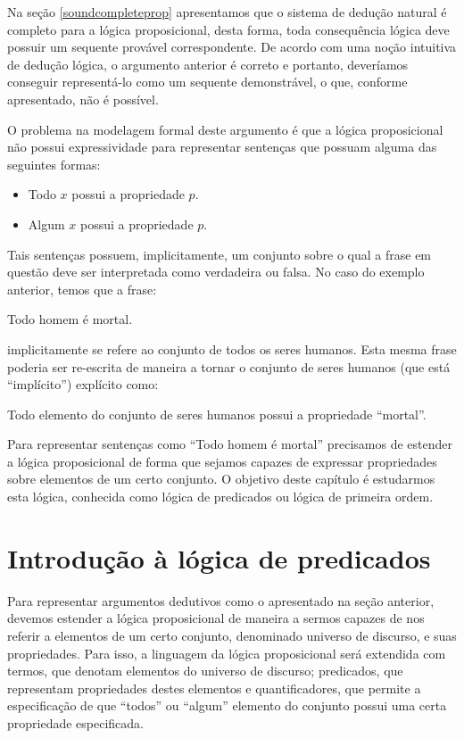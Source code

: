 Na seção \ref{soundcompleteprop} apresentamos que o sistema de dedução
natural é completo para a lógica proposicional, desta forma, toda
consequência lógica deve possuir um sequente provável
correspondente. De acordo com uma noção intuitiva de dedução lógica, o
argumento anterior é correto e portanto, deveríamos conseguir
representá-lo como um sequente demonstrável, o que, conforme
apresentado, não é possível.

O problema na modelagem formal deste argumento é que a lógica proposicional não possui expressividade para
representar sentenças que possuam alguma das seguintes formas:
\begin{itemize}
  \item Todo $x$ possui a propriedade $p$.
  \item Algum $x$ possui a propriedade $p$.
\end{itemize}
Tais sentenças possuem, implicitamente, um conjunto sobre o qual a
frase em questão deve ser interpretada como verdadeira ou falsa. No
caso do exemplo anterior, temos que a frase:
\begin{center}
Todo homem é mortal.
\end{center}
implicitamente se refere ao conjunto de todos os seres humanos. Esta
mesma frase poderia ser re-escrita de maneira a tornar o conjunto  de
seres humanos (que está ``implícito'') explícito como:
\begin{center}
Todo elemento do conjunto de seres humanos possui a propriedade ``mortal''.
\end{center}
Para representar sentenças como ``Todo homem é mortal'' precisamos de
estender a lógica proposicional de forma que sejamos capazes de
expressar propriedades sobre elementos de um certo conjunto. O
objetivo deste capítulo é estudarmos esta lógica, conhecida como
lógica de predicados ou lógica de primeira ordem.

\section{Introdução à lógica de predicados}\label{intropredlogic}

Para representar argumentos dedutivos como o apresentado na seção
anterior, devemos estender a lógica proposicional de maneira a sermos
capazes de nos referir a elementos de um certo conjunto, denominado
universo de discurso, e suas
propriedades. Para isso, a linguagem da lógica proposicional será
extendida com termos, que denotam elementos do universo de discurso;
predicados, que representam propriedades destes elementos
e quantificadores, que permite a especificação de que ``todos'' ou
``algum'' elemento do conjunto possui uma certa propriedade
especificada.

